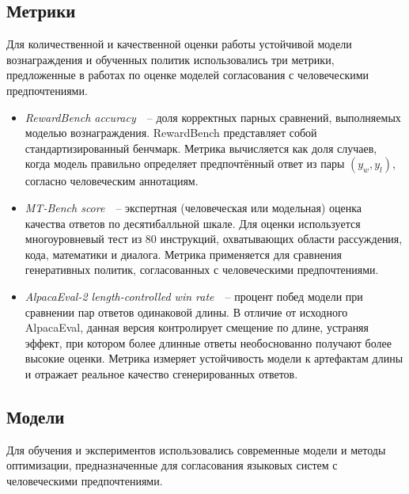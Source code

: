 \subsection{Метрики}

Для количественной и качественной оценки работы устойчивой модели вознаграждения и обученных политик использовались три метрики, предложенные в работах по оценке моделей согласования с человеческими предпочтениями.

\begin{itemize}
  \item \emph{RewardBench accuracy}~\cite{liu2024rewardbench}~-- доля корректных парных сравнений, выполняемых моделью вознаграждения.  
  RewardBench представляет собой стандартизированный бенчмарк.  
  Метрика вычисляется как доля случаев, когда модель правильно определяет предпочтённый ответ из пары $(y_w, y_l)$, согласно человеческим аннотациям.

  \item \emph{MT-Bench score}~\cite{zheng2023judging}~-- экспертная (человеческая или модельная) оценка качества ответов по десятибалльной шкале.  
  Для оценки используется многоуровневый тест из 80 инструкций, охватывающих области рассуждения, кода, математики и диалога.  
  Метрика применяется для сравнения генеративных политик, согласованных с человеческими предпочтениями.

  \item \emph{AlpacaEval-2 length-controlled win rate}~\cite{dubois2024length}~-- процент побед модели при сравнении пар ответов одинаковой длины.  
  В отличие от исходного AlpacaEval, данная версия контролирует смещение по длине, устраняя эффект, при котором более длинные ответы необоснованно получают более высокие оценки.  
  Метрика измеряет устойчивость модели к артефактам длины и отражает реальное качество сгенерированных ответов.
\end{itemize}

\subsection{Модели}

Для обучения и экспериментов использовались современные модели и методы оптимизации, предназначенные для согласования языковых систем с человеческими предпочтениями.  

